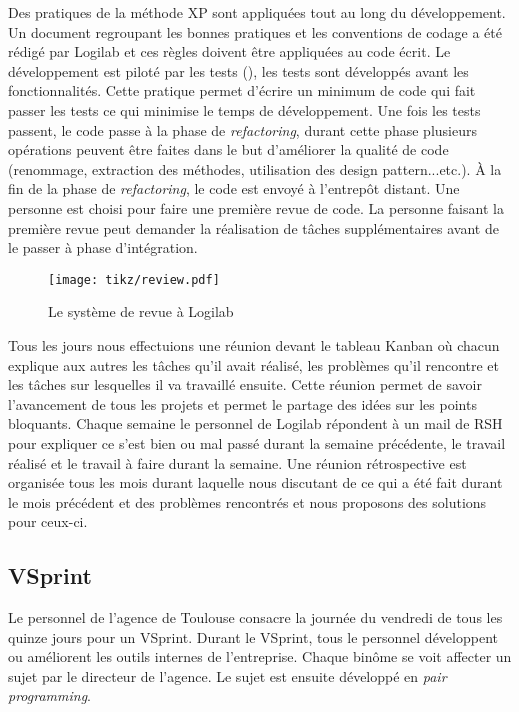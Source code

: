 Des pratiques de la méthode XP sont appliquées tout au long du développement. Un document regroupant les bonnes pratiques et les conventions de codage a été rédigé par Logilab et ces règles doivent être appliquées au code écrit. Le développement est piloté par les tests (), les tests sont développés avant les fonctionnalités. Cette pratique permet d'écrire un minimum de code qui fait passer les tests ce qui minimise le temps de développement. Une fois les tests passent, le code passe à la phase de \textit{refactoring}, durant cette phase plusieurs opérations peuvent être faites dans le but d'améliorer la qualité de code (renommage, extraction des méthodes, utilisation des design pattern...etc.). \`A la fin de la phase de \textit{refactoring}, le code est envoyé à l’entrepôt distant. Une personne est choisi pour faire une première revue de code. La personne faisant la première revue peut demander la réalisation de tâches supplémentaires avant de le passer à phase d'intégration. 

\begin{figure}
\centering
  \texttt{[image: tikz/review.pdf]}
  \caption{Le système de revue à Logilab}
  \label{fig:rest}
\end{figure}

Tous les jours nous effectuions une réunion devant le tableau Kanban où chacun explique aux autres les tâches qu'il avait réalisé, les problèmes qu'il rencontre et les tâches sur lesquelles il va travaillé ensuite. Cette réunion permet de savoir l'avancement de tous les projets et permet le partage des idées sur les points bloquants. Chaque semaine le personnel de Logilab répondent à un mail de RSH pour expliquer ce s'est bien ou mal passé durant la semaine précédente, le travail réalisé et le travail à faire durant la semaine. Une réunion rétrospective est organisée tous les mois durant laquelle nous discutant de ce qui a été fait durant le mois précédent et des problèmes rencontrés et nous proposons des solutions pour ceux-ci. 

\subsection{VSprint}
Le personnel de l'agence de Toulouse consacre la journée du vendredi de tous les quinze jours pour un VSprint. Durant le VSprint, tous le personnel développent ou améliorent les outils internes de l'entreprise. Chaque binôme se voit affecter un sujet par le directeur de l'agence. Le sujet est ensuite développé en \textit{pair programming}.

